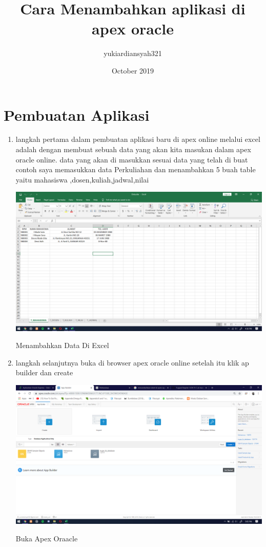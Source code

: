 \documentclass{article}
\title{Cara Menambahkan aplikasi di apex oracle}
\author{yukiardiansyah321 }
\date{October 2019}
\begin{document}
\maketitle

\section{Pembuatan Aplikasi}

\begin{enumerate}
    \item langkah pertama dalam pembuatan aplikasi baru di apex online melalui excel adalah dengan membuat sebuah data yang akan kita masukan dalam apex oracle online. data yang akan di masukkan sesuai data yang telah di buat contoh saya memasukkan data Perkuliahan dan menambahkan 5 buah table yaitu mahasiswa
    ,dosen,kuliah,jadwal,nilai
    \begin{center}
         \centering
            \includegraphics[scale=0.27]{figures/DB0.png}
        \caption{Menambahkan Data Di Excel}
        \label{excel}
    \end{center}
       
     \item langkah selanjutnya buka di browser apex oracle online setelah itu klik ap builder dan create  
    \begin{center}
         \centering
            \includegraphics[scale=0.27]{figures/DB1.png}
        \caption{Buka Apex Oraacle }
        \label{create}
    \end{center}
    

\end{enumerate}
\end{document}

